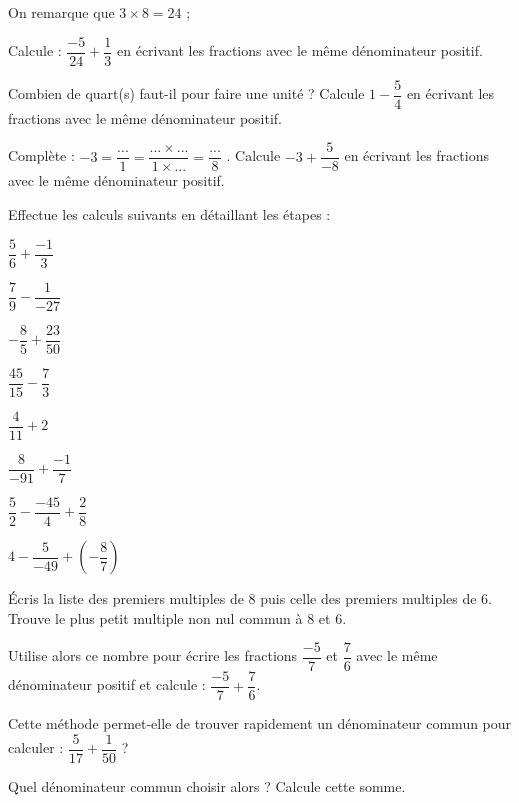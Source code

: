 \begin{exercice}

\begin{colenumerate}{1} 
\item On remarque que $3 \times 8 = 24$ ;

Calcule : $\dfrac{-5}{24}+\dfrac{1}{3}$ en écrivant les fractions avec le même dénominateur positif.

\item Combien de quart(s) faut-il pour faire une unité ? Calcule $1 - \dfrac{5}{4}$ en écrivant les fractions avec le même dénominateur positif.
\item Complète : $-3 = \dfrac{...}{1} = \dfrac{... \times ...}{1 \times ...} = \dfrac{...}{8}$ .
Calcule $-3 + \dfrac{5}{-8}$ en écrivant les fractions avec le même dénominateur positif.
\end{colenumerate} 
\end{exercice}




\begin{exercice}

Effectue les calculs suivants en détaillant les étapes :

\begin{colenumerate}{2} 
\item $\dfrac{5}{6} + \dfrac{-1}{3}$
\item $\dfrac{7}{9} - \dfrac{1}{-27}$
\item $-\dfrac{8}{5} + \dfrac{23}{50}$
\item $\dfrac{45}{15} - \dfrac{7}{3}$
\item $\dfrac{4}{11} + 2$
\item $\dfrac{8}{-91} + \dfrac{-1}{7}$
\item $\dfrac{5}{2} - \dfrac{-45}{4} + \dfrac{2}{8}$
\item $4 - \dfrac{5}{-49} + \left(-\dfrac{8}{7}\right)$
\end{colenumerate}
\end{exercice}

\begin{exercice}

\begin{colenumerate}{1} 
\item Écris la liste des premiers multiples de 8 puis celle des premiers multiples de 6. Trouve le plus petit multiple non nul commun à 8 et 6.
 
Utilise alors ce nombre pour écrire les fractions $\dfrac{-5}{7}$ et $\dfrac{7}{6}$ avec le même dénominateur positif et calcule : $\dfrac{-5}{7}+\dfrac{7}{6}$.
\item Cette méthode permet-elle de trouver rapidement un dénominateur commun pour calculer : $\dfrac{5}{17}+\dfrac{1}{50}$ ?

Quel dénominateur commun choisir alors ? Calcule cette somme.
\end{colenumerate} 
\end{exercice}



